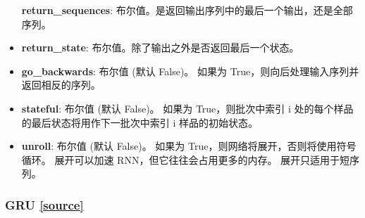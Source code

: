 \begin{itemize}
  \textbf{return\_sequences}:
  布尔值。是返回输出序列中的最后一个输出，还是全部序列。
\item
  \textbf{return\_state}: 布尔值。除了输出之外是否返回最后一个状态。
\item
  \textbf{go\_backwards}: 布尔值 (默认 False)。 如果为
  True，则向后处理输入序列并返回相反的序列。
\item
  \textbf{stateful}: 布尔值 (默认 False)。 如果为 True，则批次中索引 i
  处的每个样品 的最后状态将用作下一批次中索引 i 样品的初始状态。
\item
  \textbf{unroll}: 布尔值 (默认 False)。 如果为
  True，则网络将展开，否则将使用符号循环。 展开可以加速
  RNN，但它往往会占用更多的内存。 展开只适用于短序列。
\end{itemize}



\subsubsection{GRU {\href{https://github.com/keras-team/keras/blob/master/keras/layers/recurrent.py\#L1378}{{[}source{]}}}}

